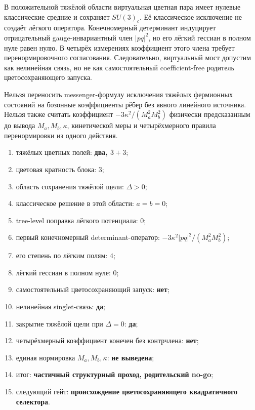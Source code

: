 \begin{theorem}
В положительной тяжёлой области виртуальная цветная пара имеет нулевые
классические средние и сохраняет $SU(3)_c$. Её классическое исключение не
создаёт лёгкого оператора. Конечномерный детерминант индуцирует отрицательный
gauge-инвариантный член $|pq|^2$, но его лёгкий гессиан в полном нуле равен
нулю. В четырёх измерениях коэффициент этого члена требует
перенормировочного согласования. Следовательно, виртуальный мост допустим
как нелинейная связь, но не как самостоятельный coefficient-free родитель
цветосохраняющего запуска.
\end{theorem}

\begin{nogocriterion}
Нельзя переносить messenger-формулу исключения тяжёлых фермионных состояний
на бозонные коэффициенты рёбер без явного линейного источника. Нельзя также
считать коэффициент $-3\kappa^2/(M_a^2M_b^2)$ физически предсказанным до
вывода $M_a,M_b,\kappa$, кинетической меры и четырёхмерного правила
перенормировки из одного действия.
\end{nogocriterion}

\begin{protocol}
\begin{enumerate}
 \item тяжёлых цветных полей: \textbf{два, $\overline3+3$};
 \item цветовая кратность блока: \textbf{$3$};
 \item область сохранения тяжёлой щели: \textbf{$\Delta>0$};
 \item классическое решение в этой области: \textbf{$a=b=0$};
 \item tree-level поправка лёгкого потенциала: \textbf{$0$};
 \item первый конечномерный determinant-оператор:
 \textbf{$-3\kappa^2|pq|^2/(M_a^2M_b^2)$};
 \item его степень по лёгким полям: \textbf{$4$};
 \item лёгкий гессиан в полном нуле: \textbf{$0$};
 \item самостоятельный цветосохраняющий запуск: \textbf{нет};
 \item нелинейная singlet-связь: \textbf{да};
 \item закрытие тяжёлой щели при $\Delta=0$: \textbf{да};
 \item четырёхмерный коэффициент конечен без контрчлена: \textbf{нет};
 \item единая нормировка $M_a,M_b,\kappa$: \textbf{не выведена};
 \item итог: \textbf{частичный структурный проход, родительский no-go};
 \item следующий гейт: \textbf{происхождение цветосохраняющего
 квадратичного селектора}.
\end{enumerate}
\end{protocol}

